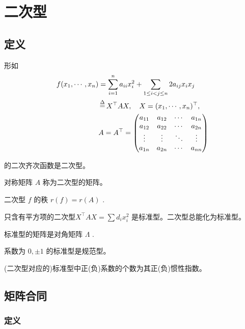 \chapter{二次型}

\section{定义}


形如 
\begin{equation*}
    \begin{aligned}
        f(x_1,\cdots,x_n) &= 
        \sum_{i = 1}^n a_{ii}x_i^2 + 
        \sum_{1\leq i < j \leq n} 2 a_{ij}x_ix_j \\ 
        &\mathop=\limits^\Delta X^\top AX,\quad X = (x_1,\cdots, x_n)^\top,\\ 
        & A = A^\top = \begin{pmatrix}
            a_{11}&a_{12}&\cdots&a_{1n}\\ 
            a_{12}&a_{22}&\cdots&a_{2n}\\ 
            \vdots&\vdots&\ddots&\vdots\\ 
            a_{1n}&a_{2n}&\cdots&a_{nn}\\ 
        \end{pmatrix}
    \end{aligned}
\end{equation*}

的二次齐次函数是二次型。

对称矩阵 $ A $ 称为二次型的矩阵。

二次型 $ f $ 的秩 $ r(f) = r(A) $ .


只含有平方项的二次型$ X^\top AX = \sum d_{i}x_i^2 $ 是标准型。二次型总能化为标准型。

标准型的矩阵是对角矩阵 $ \Lambda $ .


系数为 $ 0,\pm 1 $ 的标准型是规范型。


(二次型对应的)标准型中正(负)系数的个数为其正(负)惯性指数。

\section{矩阵合同}

\subsection{定义}


